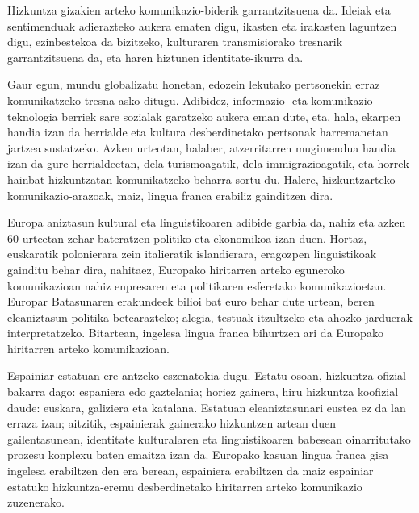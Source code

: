 \begin{multicols}{2}
Hizkuntza gizakien arteko komunikazio-biderik garrantzitsuena da. Ideiak eta sentimenduak adierazteko aukera ematen digu, ikasten eta irakasten laguntzen digu, ezinbestekoa da bizitzeko, kulturaren transmisiorako tresnarik garrantzitsuena da, eta haren hiztunen identitate-ikurra da.


Gaur egun, mundu globalizatu honetan, edozein lekutako pertsonekin erraz komunikatzeko tresna asko ditugu. Adibidez, informazio- eta komunikazio-teknologia berriek sare sozialak garatzeko aukera eman dute, eta, hala, ekarpen handia izan da herrialde eta kultura desberdinetako pertsonak harremanetan jartzea sustatzeko. Azken urteotan, halaber, atzerritarren mugimendua handia izan da gure herrialdeetan, dela turismoagatik, dela immigrazioagatik, eta horrek hainbat hizkuntzatan komunikatzeko beharra sortu du. Halere, hizkuntzarteko komunikazio-arazoak, maiz, lingua franca erabiliz gainditzen dira.

Europa aniztasun kultural eta linguistikoaren adibide garbia da, nahiz eta azken 60 urteetan zehar bateratzen politiko eta ekonomikoa izan duen. Hortaz, euskaratik polonierara zein italieratik islandierara, eragozpen linguistikoak gainditu behar dira, nahitaez, Europako hiritarren arteko eguneroko komunikazioan nahiz enpresaren eta politikaren esferetako komunikazioetan. Europar Batasunaren erakundeek bilioi bat euro behar dute urtean, beren eleaniztasun-politika betearazteko; alegia, testuak itzultzeko eta ahozko jarduerak interpretatzeko. Bitartean, ingelesa lingua franca bihurtzen ari da Europako hiritarren arteko komunikazioan.

Espainiar estatuan ere antzeko eszenatokia dugu. Estatu osoan, hizkuntza ofizial bakarra dago: espaniera edo gaztelania; horiez gainera, hiru hizkuntza koofizial daude: euskara, galiziera eta katalana. Estatuan eleaniztasunari eustea ez da lan erraza izan; aitzitik, espainierak gainerako hizkuntzen artean duen gailentasunean, identitate kulturalaren eta linguistikoaren babesean oinarritutako prozesu konplexu baten emaitza izan da. Europako kasuan lingua franca gisa ingelesa erabiltzen den era berean, espainiera erabiltzen da maiz espainiar estatuko hizkuntza-eremu desberdinetako hiritarren arteko komunikazio zuzenerako.   

 

\end{multicols}
